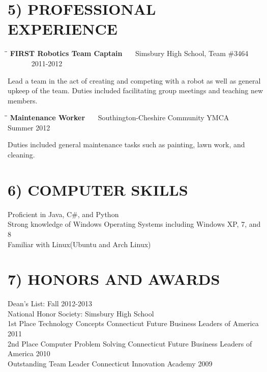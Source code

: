 \documentclass{res}
\begin{document}
\begin{resume}
\section{5) PROFESSIONAL EXPERIENCE}
    \vspace{-5pt}
   \begin{tabbing}
   \hspace{2.3in}\= \hspace{2.6in}\= \kill %
    {\bf FIRST Robotics Team Captain} \>~~~Simsbury High School, Team \#3464 \> ~~~~~~ 2011-2012\\
   \end{tabbing}\vspace{-30pt}
    Lead a team in the act of creating and competing with a robot as well as general upkeep of the team.
    Duties included facilitating group meetings and teaching new members.
    \vspace{-5pt}
   \begin{tabbing}%
   \hspace{2.3in}\= \hspace{2.6in}\= \kill %
   {\bf Maintenance Worker }  \>~~~Southington-Cheshire Community YMCA \> ~~~~~~ Summer 2012\\
   \end{tabbing}\vspace{-30pt}
    Duties included general maintenance tasks such as painting, lawn work,
    and cleaning. 
    
\section{6) COMPUTER SKILLS}   
    \vspace{2pt}       
    Proficient in Java, C\#, and Python\\
    Strong knowledge of Windows Operating Systems including Windows XP, 7, and 8\\
    Familiar with Linux(Ubuntu and Arch Linux)
    \vspace{-5pt}
    
\section{7) HONORS AND AWARDS}          
    \vspace{2pt}
    Dean's List: Fall 2012-2013  \\        
    National Honor Society: Simsbury High School  \\        
    1st Place Technology Concepts Connecticut Future Business Leaders of America  2011\\        
    2nd Place Computer Problem Solving Connecticut Future Business Leaders of America 2010\\
    Outstanding Team Leader Connecticut Innovation Academy 2009
    \vspace{-5pt}
 

\end{resume}
\end{document}
